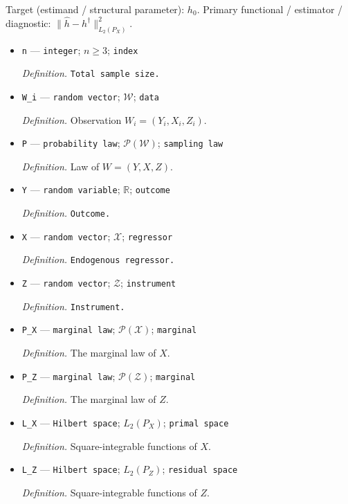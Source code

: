 \documentclass{article}
\begin{document}
Target (estimand / structural parameter): \(h_0\).
Primary functional / estimator / diagnostic: \(\|\widehat h-h^\dagger\|_{L_2(P_X)}^2\).
\begin{itemize}
  \item \texttt{n} --- \texttt{integer}; \(n\ge 3\); \texttt{index}
  \par\smallskip\noindent\emph{Definition.} \texttt{Total sample size.}
  \item \texttt{W\_\allowbreak{}i} --- \texttt{random vector}; \(\mathcal W\); \texttt{data}
  \par\smallskip\noindent\emph{Definition.} Observation \(W_i=(Y_i,X_i,Z_i)\).
  \item \texttt{P} --- \texttt{probability law}; \(\mathcal P(\mathcal W)\); \texttt{sampling law}
  \par\smallskip\noindent\emph{Definition.} Law of \(W=(Y,X,Z)\).
  \item \texttt{Y} --- \texttt{random variable}; \(\mathbb R\); \texttt{outcome}
  \par\smallskip\noindent\emph{Definition.} \texttt{Outcome.}
  \item \texttt{X} --- \texttt{random vector}; \(\mathcal X\); \texttt{regressor}
  \par\smallskip\noindent\emph{Definition.} \texttt{Endogenous regressor.}
  \item \texttt{Z} --- \texttt{random vector}; \(\mathcal Z\); \texttt{instrument}
  \par\smallskip\noindent\emph{Definition.} \texttt{Instrument.}
  \item \texttt{P\_\allowbreak{}X} --- \texttt{marginal law}; \(\mathcal P(\mathcal X)\); \texttt{marginal}
  \par\smallskip\noindent\emph{Definition.} The marginal law of \(X\).
  \item \texttt{P\_\allowbreak{}Z} --- \texttt{marginal law}; \(\mathcal P(\mathcal Z)\); \texttt{marginal}
  \par\smallskip\noindent\emph{Definition.} The marginal law of \(Z\).
  \item \texttt{L\_\allowbreak{}X} --- \texttt{Hilbert space}; \(L_2(P_X)\); \texttt{primal space}
  \par\smallskip\noindent\emph{Definition.} Square-integrable functions of \(X\).
  \item \texttt{L\_\allowbreak{}Z} --- \texttt{Hilbert space}; \(L_2(P_Z)\); \texttt{residual space}
  \par\smallskip\noindent\emph{Definition.} Square-integrable functions of \(Z\).

\end{itemize}
\end{document}
